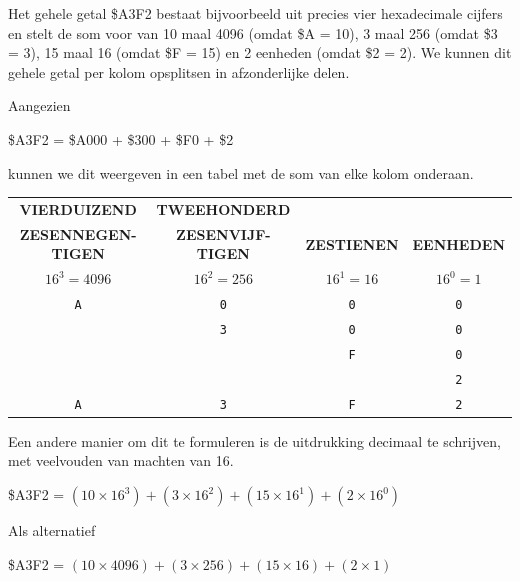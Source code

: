 Het gehele getal \$A3F2 bestaat bijvoorbeeld uit precies vier hexadecimale cijfers en stelt de som voor van 10 maal 4096 (omdat \$A = 10), 3 maal 256 (omdat \$3 = 3), 15 maal 16 (omdat \$F = 15) en 2 eenheden (omdat \$2 = 2). We kunnen dit gehele getal per kolom opsplitsen in afzonderlijke delen.

Aangezien
\begin{center}
  \$A3F2 = \$A000 + \$300 + \$F0 + \$2
\end{center}
kunnen we dit weergeven in een tabel met de som van elke kolom onderaan.

\begin{center}
  \begin{tabular}{|c|c|c|c|}
  \hline
    \small{\bf VIERDUIZEND} & \small{\bf TWEEHONDERD} &  &  \\
    \small{\bf ZESENNEGEN-TIGEN} & \small{\bf ZESENVIJF-TIGEN} & \small{\bf ZESTIENEN} & \small{\bf EENHEDEN} \\ \hline
	  \small{$16^{3} = 4096$} & \small{$16^{2} = 256$} & \small{$16^{1} = 16$} & \small{$16^{0} = 1$} \\ \hhline{|=|=|=|=|}
	  \large{\texttt{A}} & \large{\texttt{0}} & \large{\texttt{0}} & \large{\texttt{0}} \\ \hline
	            & \large{\texttt{3}} & \large{\texttt{0}} & \large{\texttt{0}} \\ \hline
	            &           & \large{\texttt{F}} & \large{\texttt{0}} \\ \hline
	            &           &           & \large{\texttt{2}} \\ \hhline{|=|=|=|=|}
	   \Large{\texttt{A}} & \Large{\texttt{3}}  & \Large{\texttt{F}}  & \Large{\texttt{2}} \\ \hline
  \end{tabular}
\end{center}

Een andere manier om dit te formuleren is de uitdrukking decimaal te schrijven, met veelvouden van machten van 16.

\begin{center}
  \$A3F2 = $(10 \times 16^{3}) + (3 \times 16^{2}) + (15 \times 16^{1}) + (2 \times 16^{0})$
\end{center}

Als alternatief

\begin{center}
  \$A3F2 = $(10 \times 4096) + (3 \times 256) + (15 \times 16) + (2 \times 1)$
\end{center}

